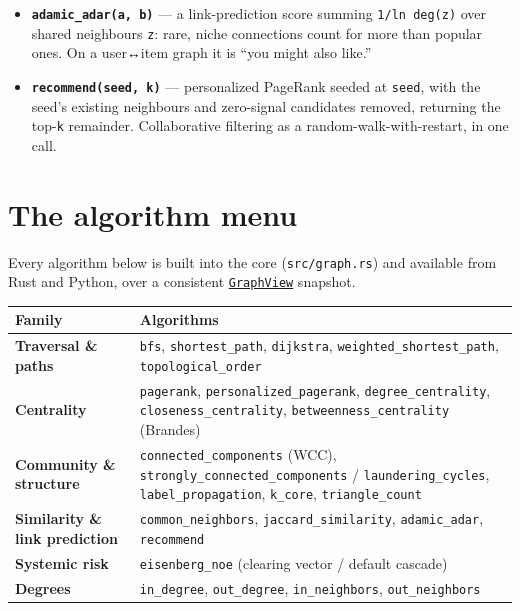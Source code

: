 \documentclass[
  11pt,
  openany]{book}
\providecommand{\tightlist}{%
  \setlength{\itemsep}{0pt}\setlength{\parskip}{0pt}}
\begin{document}
\begin{itemize}
\tightlist
\item
  \textbf{\texttt{adamic\_adar(a,\ b)}} --- a link-prediction score
  summing \texttt{1/ln\ deg(z)} over shared neighbours \texttt{z}: rare,
  niche connections count for more than popular ones. On a user↔item
  graph it is ``you might also like.''
\item
  \textbf{\texttt{recommend(seed,\ k)}} --- personalized PageRank seeded
  at \texttt{seed}, with the seed's existing neighbours and zero-signal
  candidates removed, returning the top-\texttt{k} remainder.
  Collaborative filtering as a random-walk-with-restart, in one call.
\end{itemize}

\section{The algorithm menu}\label{the-algorithm-menu}

Every algorithm below is built into the core (\texttt{src/graph.rs}) and
available from Rust and Python, over a consistent
\href{snapshot.md}{\texttt{GraphView}} snapshot.

\begin{longtable}[]{@{}
  >{\raggedright\arraybackslash}p{}
  >{\raggedright\arraybackslash}p{}@{}}
\toprule\noalign{}
\begin{minipage}[b]{\linewidth}\raggedright
Family
\end{minipage} & \begin{minipage}[b]{\linewidth}\raggedright
Algorithms
\end{minipage} \\
\midrule\noalign{}
\endhead
\bottomrule\noalign{}
\endlastfoot
\textbf{Traversal \& paths} & \texttt{bfs}, \texttt{shortest\_path},
\texttt{dijkstra}, \texttt{weighted\_shortest\_path},
\texttt{topological\_order} \\
\textbf{Centrality} & \texttt{pagerank},
\texttt{personalized\_pagerank}, \texttt{degree\_centrality},
\texttt{closeness\_centrality}, \texttt{betweenness\_centrality}
(Brandes) \\
\textbf{Community \& structure} & \texttt{connected\_components} (WCC),
\texttt{strongly\_connected\_components} / \texttt{laundering\_cycles},
\texttt{label\_propagation}, \texttt{k\_core},
\texttt{triangle\_count} \\
\textbf{Similarity \& link prediction} & \texttt{common\_neighbors},
\texttt{jaccard\_similarity}, \texttt{adamic\_adar},
\texttt{recommend} \\
\textbf{Systemic risk} & \texttt{eisenberg\_noe} (clearing vector /
default cascade) \\
\textbf{Degrees} & \texttt{in\_degree}, \texttt{out\_degree},
\texttt{in\_neighbors}, \texttt{out\_neighbors} \\
\end{longtable}
\end{document}
